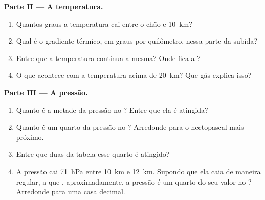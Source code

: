 \begin{problem}
\noindent\textbf{Parte II --- A temperatura.}\par\nopagebreak
\begin{enumerate}[resume, beginpenalty=10000]
  \item Quantos graus a temperatura cai entre o chão e \qty{10}{km}?
  \item Qual é o gradiente térmico, em graus por quilômetro, nessa parte
        da subida?
  \item Entre que  a temperatura continua a mesma? Onde fica a
        ?
  \item O que acontece com a temperatura acima de \qty{20}{km}? Que gás
        explica isso?
\end{enumerate}

\noindent\textbf{Parte III --- A pressão.}\par\nopagebreak
\begin{enumerate}[resume, beginpenalty=10000]
  \item Quanto é a metade da pressão no ? Entre que 
        ela é atingida?
  \item Quanto é um quarto da pressão no ? Arredonde para o
        hectopascal mais próximo.
  \item Entre que duas  da tabela esse quarto é atingido?
  \item A pressão cai \qty{71}{hPa} entre \qty{10}{km} e \qty{12}{km}.
        Supondo que ela caia de maneira regular, a que ,
        aproximadamente, a pressão é um quarto do seu valor no ? Arredonde para uma casa decimal.
\end{enumerate}
\end{problem}
